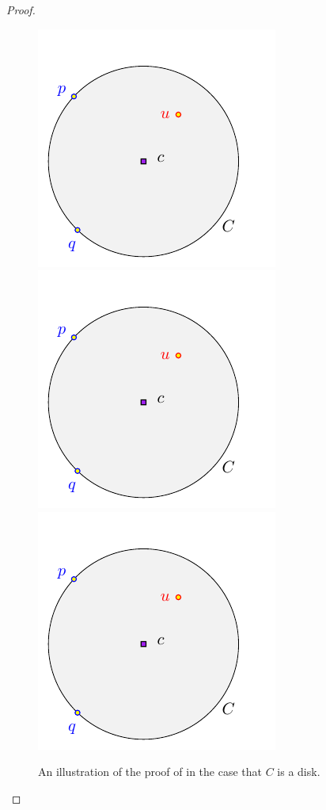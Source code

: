 \begin{proof}
    \begin{figure}[h]
        \phantom{}\hfill%
        \includegraphics[page=1]{figs/shrink}%
        \hfill%
        \includegraphics[page=2]{figs/shrink}%
        \hfill%
        \includegraphics[page=3]{figs/shrink}%
        \hfill%
        \phantom{}%
        \caption{An illustration of the proof of  in the case that $C$ is a disk.}
    \end{figure}


\end{proof}

